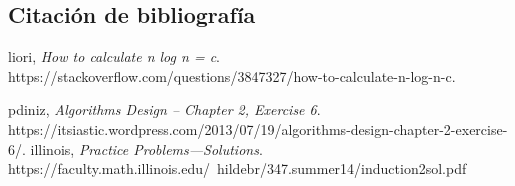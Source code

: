 \documentclass[a4paper,12pt]{article}
\begin{document}
\subsection{Citación de bibliografía}

\begin{thebibliography}{15}

  liori,
  \emph{How to calculate n log n = c}.
  https://stackoverflow.com/questions/3847327/how-to-calculate-n-log-n-c.

  pdiniz,
  \emph{Algorithms Design – Chapter 2, Exercise 6}.
  https://itsiastic.wordpress.com/2013/07/19/algorithms-design-chapter-2-exercise-6/.
  illinois,
  \emph{Practice Problems—Solutions}.
  https://faculty.math.illinois.edu/~hildebr/347.summer14/induction2sol.pdf

\end{thebibliography}

\end{document}
